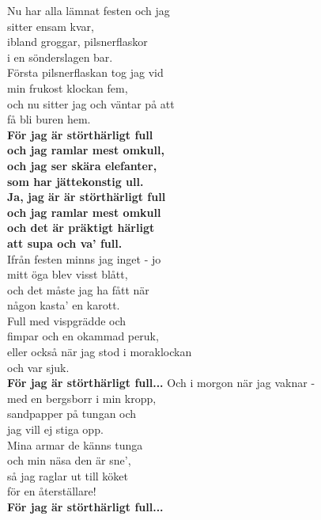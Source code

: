 \documentclass[a6paper, 10pt, twoside]{article}
\begin{document}
\small %
\begin{center}
\end{center}
\begin{lyrics}
Nu har alla lämnat festen och jag \\
sitter ensam kvar,\\
ibland groggar, pilsnerflaskor\\
i en sönderslagen bar.\\
Första pilsnerflaskan tog jag vid\\
min frukost klockan fem,\\
och nu sitter jag och väntar på att\\
få bli buren hem.
\vspace{5pt}\\
\textbf{För jag är störthärligt full\\
och jag ramlar mest omkull,\\
och jag ser skära elefanter,\\
som har jättekonstig ull.\\
Ja, jag är är störthärligt full\\
och jag ramlar mest omkull\\
och det är präktigt härligt\\
att supa och va' full.}
\vspace{5pt}\\
Ifrån festen minns jag inget - jo\\
mitt öga blev visst blått,\\
och det måste jag ha fått när\\
någon kasta' en karott.\\
Full med vispgrädde och\\
fimpar och en okammad peruk,\\
eller också när jag stod i moraklockan\\
och var sjuk.
\vspace{5pt}\\
\textbf{För jag är störthärligt full...}
\newpage
\noindent
Och i morgon när jag vaknar -\\
med en bergsborr i min kropp,\\
sandpapper på tungan och\\
jag vill ej stiga opp.\\
Mina armar de känns tunga\\
och min näsa den är sne',\\
så jag raglar ut till köket\\
för en återställare!
\vspace{5pt}\\
\textbf{För jag är störthärligt full...}
\end{lyrics}
\end{document}
